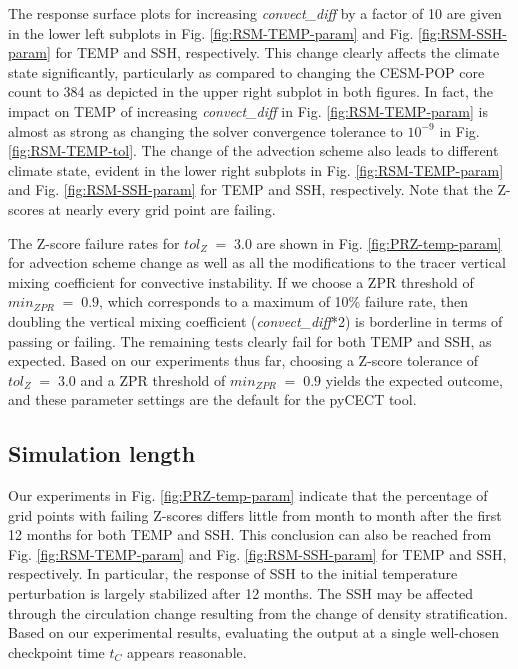 \documentclass[gmd, manuscript]{copernicus}
\begin{document}
The response surface plots for increasing \textit{convect\_diff} by a factor of 10 are given in the lower left subplots in Fig. \ref{fig:RSM-TEMP-param} and Fig. \ref{fig:RSM-SSH-param} for TEMP and SSH, respectively.  This change clearly affects the climate state significantly, particularly as compared to changing the CESM-POP core count to 384 as depicted in the upper right subplot in both figures.  In fact, the impact on TEMP of increasing \textit{convect\_diff} in Fig. \ref{fig:RSM-TEMP-param} is almost as strong as changing the solver convergence tolerance to $10^{-9}$ in Fig. \ref{fig:RSM-TEMP-tol}.  The change of the advection scheme also leads to different climate state, evident in the lower right subplots in Fig. \ref{fig:RSM-TEMP-param} and Fig. \ref{fig:RSM-SSH-param} for TEMP and SSH, respectively.  Note that the Z-scores at nearly every grid point are failing.

The Z-score failure rates for $tol_{Z} \; = \; 3.0$ are shown in Fig. \ref{fig:PRZ-temp-param} for advection scheme change as well as all the modifications to the tracer vertical mixing coefficient for convective instability.  If we choose a ZPR threshold of $min_{ZPR} \; = \; 0.9$, which corresponds to a maximum of 10\% failure rate,  then doubling the vertical mixing coefficient (\textit{convect\_diff}*2) is borderline in terms of passing or failing.  The remaining tests clearly fail for both TEMP and SSH, as expected. Based on our experiments thus far, choosing a Z-score tolerance of $tol_{Z} \; = \; 3.0$ and a ZPR threshold of $min_{ZPR} \; = \; 0.9$ yields the expected outcome, and these parameter settings are the default for the pyCECT tool.  


 \subsection{Simulation length}



 Our experiments in Fig. \ref{fig:PRZ-temp-param} indicate that the percentage of grid points with failing Z-scores differs little from month to month after the first 12 months for both TEMP and SSH.  This conclusion can also be reached from Fig. \ref{fig:RSM-TEMP-param} and Fig. \ref{fig:RSM-SSH-param} for TEMP and SSH, respectively.  In particular, the response of SSH to the initial temperature perturbation is largely stabilized after 12 months. The SSH may be affected through the circulation change resulting from the change of density stratification.  Based on our experimental results, evaluating the output at a single well-chosen checkpoint time $t_C$ appears reasonable.
\end{document}
